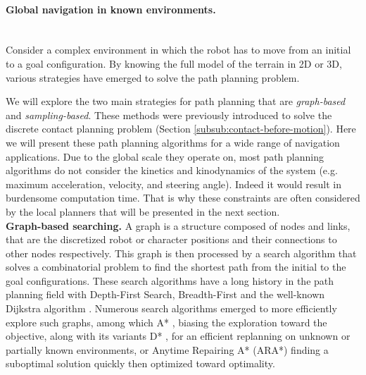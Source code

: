 \paragraph{Global navigation in known environments.}\mbox{}\\

Consider a complex environment in which the robot has to move from an initial to a goal configuration.
By knowing the full model of the terrain in 2D or 3D, various strategies have emerged to solve the path planning problem.

We will explore the two main strategies for path planning that are \textit{graph-based} and \textit{sampling-based}.
These methods were previously introduced to solve the discrete contact planning problem (Section \ref{subsub:contact-before-motion}).
Here we will present these path planning algorithms for a wide range of navigation applications.
Due to the global scale they operate on, most path planning algorithms do not consider the kinetics and kinodynamics of the system (e.g. maximum acceleration, velocity, and steering angle). 
Indeed it would result in burdensome computation time. 
That is why these constraints are often considered by the local planners that will be presented in the next section.\\

\noindent\textbf{Graph-based searching.}
A graph is a structure composed of nodes and links, that are the discretized robot or character positions and their connections to other nodes respectively.
This graph is then processed by a search algorithm that solves a combinatorial problem to find the shortest path from the initial to the goal configurations. 
These search algorithms have a long history in the path planning field with Depth-First Search, Breadth-First and the well-known Dijkstra algorithm \cite{dijkstra_1959}. 
Numerous search algorithms emerged to more efficiently explore such graphs, among which A* \cite{A_star_1968}, biasing the exploration toward the objective, along with its variants D* \cite{D_star_1994}, for an efficient replanning on unknown or partially known environments, or Anytime Repairing A* (ARA*) \cite{ara_star_2003} finding a suboptimal solution quickly then optimized toward optimality.

